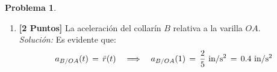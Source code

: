 \documentclass[ a4paper, twoside, 11pt]{article}
\newcommand{\tsup}[1]{\ensuremath{^{\text{#1}}}}
\theoremstyle{definition}
\newtheorem{problem}[definition]{Problema}
\begin{document}
\begin{problem}
\begin{enumerate}[label=\alph*.]
\item \textbf{[2 Puntos]} La aceleraci\'on del collar\'in $B$ relativa a la varilla $OA$. \\[1ex] \emph{Soluci\'on:} Es evidente que: 
\[
a_{B/OA}(t) \, = \, \ddot{r}(t) \quad \Longrightarrow \quad a_{B/OA}(1) \, = \, \frac{2}{5} \text{ in/s\tsup{2}} \, = \, 0.4 \text{ in/s\tsup{2}}
\]
\end{enumerate}

\end{problem}
\vspace{\baselineskip}
\end{document}
